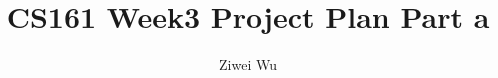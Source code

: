 \documentclass[11pt]{article}
\begin{document}


\title{CS161 Week3 Project Plan Part a}%
\author{Ziwei Wu} %

\maketitle


\end{document}
